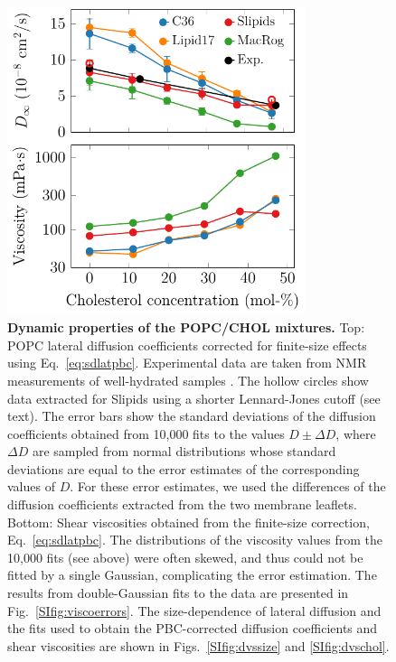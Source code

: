 \documentclass[journal=jctcce]{achemso}
\begin{document}
\begin{figure}[htb!]
  \centering
  \includegraphics[width=8.7cm]{../FIGS/dynamics.pdf}
  \caption{\label{fig:dynamics}%
  \textbf{Dynamic properties of the POPC/CHOL mixtures.}
  Top: POPC lateral diffusion coefficients corrected for finite-size effects using Eq.~\eqref{eq:sdlatpbc}. Experimental data are taken from NMR measurements of well-hydrated samples \cite{filippov2003influence,filippov2003effect}. The hollow circles show data extracted for Slipids using a shorter Lennard-Jones cutoff (see text). The error bars show the standard deviations of the diffusion coefficients obtained from 10,000 fits to the values $D\pm\Delta D$, where $\Delta D$ are sampled from normal distributions whose standard deviations are equal to the error estimates of the corresponding values of $D$. For these error estimates, we used the differences of the diffusion coefficients extracted from the two membrane leaflets.
  Bottom: Shear viscosities obtained from the finite-size correction, Eq.~\eqref{eq:sdlatpbc}. The distributions of the viscosity values from the 10,000 fits (see above) were often skewed, and thus could not be fitted by a single Gaussian, complicating the error estimation. The results from double-Gaussian fits to the data are presented in Fig.~\ref{SIfig:viscoerrors}.
  The size-dependence of lateral diffusion and the fits used to obtain the PBC-corrected diffusion coefficients and shear viscosities are shown in Figs.~\ref{SIfig:dvssize} and \ref{SIfig:dvschol}.
  }
\end{figure}
\end{document}
